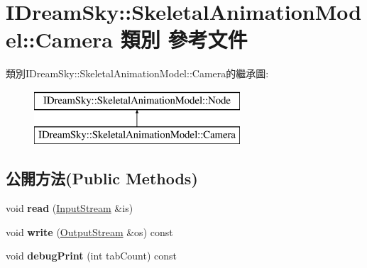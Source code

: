 \hypertarget{class_i_dream_sky_1_1_skeletal_animation_model_1_1_camera}{}\section{I\+Dream\+Sky\+:\+:Skeletal\+Animation\+Model\+:\+:Camera 類別 參考文件}
\label{class_i_dream_sky_1_1_skeletal_animation_model_1_1_camera}
類別\+I\+Dream\+Sky\+:\+:Skeletal\+Animation\+Model\+:\+:Camera的繼承圖\+:\begin{figure}[H]
\begin{center}
\leavevmode
\includegraphics[height=2.000000cm]{class_i_dream_sky_1_1_skeletal_animation_model_1_1_camera}
\end{center}
\end{figure}
\subsection*{公開方法(Public Methods)}
\begin{DoxyCompactItemize}
\item 
void {\bfseries read} (\hyperlink{class_i_dream_sky_1_1_input_stream}{Input\+Stream} \&is)\hypertarget{class_i_dream_sky_1_1_skeletal_animation_model_1_1_camera_aaee8758a30a6e0cc985917771c2b6dd6}{}\label{class_i_dream_sky_1_1_skeletal_animation_model_1_1_camera_aaee8758a30a6e0cc985917771c2b6dd6}

\item 
void {\bfseries write} (\hyperlink{class_i_dream_sky_1_1_output_stream}{Output\+Stream} \&os) const \hypertarget{class_i_dream_sky_1_1_skeletal_animation_model_1_1_camera_a9adc41587c79298662659ecc4ef3b44a}{}\label{class_i_dream_sky_1_1_skeletal_animation_model_1_1_camera_a9adc41587c79298662659ecc4ef3b44a}

\item 
void {\bfseries debug\+Print} (int tab\+Count) const \hypertarget{class_i_dream_sky_1_1_skeletal_animation_model_1_1_camera_a9fd6e7988f459cebba236801e9234b9d}{}\label{class_i_dream_sky_1_1_skeletal_animation_model_1_1_camera_a9fd6e7988f459cebba236801e9234b9d}

\end{DoxyCompactItemize}
